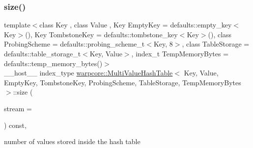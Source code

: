 \subsubsection{\texorpdfstring{size()}{size()}}
{\footnotesize\ttfamily template$<$class Key , class Value , Key Empty\+Key = defaults\+::empty\+\_\+key$<$\+Key$>$(), Key Tombstone\+Key = defaults\+::tombstone\+\_\+key$<$\+Key$>$(), class Probing\+Scheme  = defaults\+::probing\+\_\+scheme\+\_\+t$<$\+Key, 8$>$, class Table\+Storage  = defaults\+::table\+\_\+storage\+\_\+t$<$\+Key, Value$>$, index\+\_\+t Temp\+Memory\+Bytes = defaults\+::temp\+\_\+memory\+\_\+bytes()$>$ \\
\+\_\+\+\_\+host\+\_\+\+\_\+ index\+\_\+type \hyperlink{classwarpcore_1_1MultiValueHashTable}{warpcore\+::\+Multi\+Value\+Hash\+Table}$<$ Key, Value, Empty\+Key, Tombstone\+Key, Probing\+Scheme, Table\+Storage, Temp\+Memory\+Bytes $>$\+::size (\begin{DoxyParamCaption}\item[{const cuda\+Stream\+\_\+t}]{stream = {} }\end{DoxyParamCaption}) const\hspace{0.3cm}{\ttfamily [inline]}, {\ttfamily [noexcept]}}



number of values stored inside the hash table 


